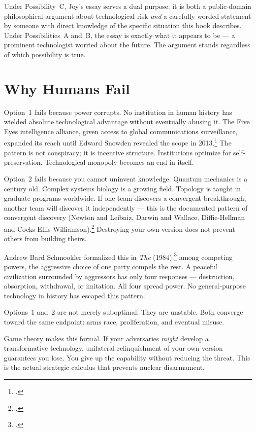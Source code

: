 Under Possibility~C, Joy's essay serves a dual purpose: it is both a public-domain philosophical argument about technological risk \textit{and} a carefully worded statement by someone with direct knowledge of the specific situation this book describes. Under Possibilities~A and~B, the essay is exactly what it appears to be --- a prominent technologist worried about the future. The argument stands regardless of which possibility is true.

\section*{Why Humans Fail}
\label{pos06:why-humans-fail}

Option~1 fails because power corrupts. No institution in human history has wielded absolute technological advantage without eventually abusing it. The Five Eyes intelligence alliance, given access to global communications surveillance, expanded its reach until Edward Snowden revealed the scope in 2013.\footcite{greenwald2014} The pattern is not conspiracy; it is incentive structure. Institutions optimize for self-preservation. Technological monopoly becomes an end in itself.

Option~2 fails because you cannot uninvent knowledge. Quantum mechanics is a century old. Complex systems biology is a growing field. Topology is taught in graduate programs worldwide. If one team discovers a convergent breakthrough, another team will discover it independently --- this is the documented pattern of convergent discovery (Newton and Leibniz, Darwin and Wallace, Diffie-Hellman and Cocks-Ellis-Williamson).\footcite{merton1961} Destroying your own version does not prevent others from building theirs.

Andrew Bard Schmookler formalized this in \textit{The } (1984):\footcite{schmookler1984} among competing powers, the aggressive choice of one party compels the rest. A peaceful civilization surrounded by aggressors has only four responses --- destruction, absorption, withdrawal, or imitation. All four spread power. No general-purpose technology in history has escaped this pattern.

Options~1 and~2 are not merely suboptimal. They are unstable. Both converge toward the same endpoint: arms race, proliferation, and eventual misuse.

Game theory makes this formal. If your adversaries \textit{might} develop a transformative technology, unilateral relinquishment of your own version guarantees you lose. You give up the capability without reducing the threat. This is the actual strategic calculus that prevents nuclear disarmament.

